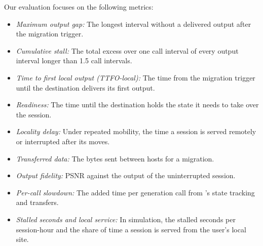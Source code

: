  Our evaluation focuses on the following metrics:
\begin{itemize}[leftmargin=*, itemsep=0.1ex, topsep=0.5ex]
    \item \textit{Maximum output gap:} The longest interval without a delivered output after the migration trigger.
    \item \textit{Cumulative stall:} The total excess over one call interval of every output interval longer than 1.5
      call intervals.
    \item \textit{Time to first local output (TTFO-local):} The time from the migration trigger until the destination
      delivers its first output.
    \item \textit{Readiness:} The time until the destination holds the state it needs to take over the session.
    \item \textit{Locality delay:} Under repeated mobility, the time a session is served remotely or interrupted after
      its moves.
    \item \textit{Transferred data:} The bytes sent between hosts for a migration.
    \item \textit{Output fidelity:} PSNR against the output of the uninterrupted session.
    \item \textit{Per-call slowdown:} The added time per generation call from \sys's state tracking and transfers.
    \item \textit{Stalled seconds and local service:} In simulation, the stalled seconds per session-hour and the
      share of time a session is served from the user's local site.
\end{itemize}

